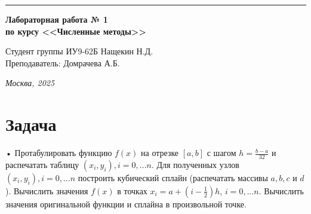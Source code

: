 \documentclass[a4paper, 14pt]{extarticle}
\begin{document}
\begin{titlepage}
\vspace*{-16pt}
\hspace{30pt}\rule{0.866\textwidth}{0.4pt}
  
\vspace{11em}

\begin{center}
\Large {\bf Лабораторная работа № 1} \\ 
\large {\bf по курсу <<Численные методы>>} \\ 
\end{center}\normalsize

\vspace{8em}


\begin{flushright}
  {Студент группы ИУ9-62Б Нащекин Н.Д.\hspace*{15pt} \\
  \vspace{2ex}
  Преподаватель: Домрачева А.Б.\hspace*{15pt}}
\end{flushright}

\bigskip

\vfill
 

\begin{center}
\textsl{Москва, 2025}
\end{center}
\end{titlepage}

\renewcommand{\ttdefault}{pcr}

\setlength{\tabcolsep}{3pt}
\newpage
\setcounter{page}{2}

\section{Задача}
\begin{flushleft}
• Протабулировать функцию $f(x)$ на отрезке $[a, b]$ с шагом $h = \frac{b - a}{32}$
и распечатать таблицу $(x_i, y_i), i = 0, ... n$. Для полученных узлов 
$(x_i, y_i), i = 0, ... n$ построить кубический сплайн (распечатать массивы $a, b, c$ и $d$).
Вычислить значения $f(x)$ в точках $x_i = a + (i-\frac{1}{2})h$, $i = 0, ... n$.
Вычислить значения оригинальной функции и сплайна в произвольной точке.


\end{flushleft}
\pagebreak
\end{document}
